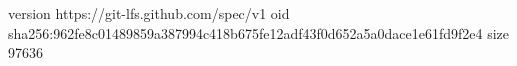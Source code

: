 version https://git-lfs.github.com/spec/v1
oid sha256:962fe8c01489859a387994c418b675fe12adf43f0d652a5a0dace1e61fd9f2e4
size 97636
